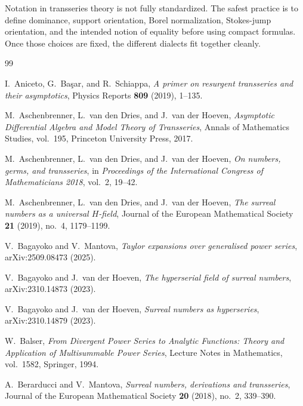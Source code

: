 \documentclass[11pt,openany]{book}
\theoremstyle{definition}
\theoremstyle{plain}
\theoremstyle{remark}
\begin{document}
\begin{summarybox}
Notation in transseries theory is not fully standardized. The safest practice
is to define dominance, support orientation, Borel normalization, Stokes-jump
orientation, and the intended notion of equality before using compact
formulas. Once those choices are fixed, the different dialects fit together
cleanly.
\end{summarybox}


\backmatter

\begin{thebibliography}{99}
{}

I.~Aniceto, G.~Ba\c{s}ar, and R.~Schiappa,
\emph{A primer on resurgent transseries and their asymptotics},
Physics Reports \textbf{809} (2019), 1--135.

M.~Aschenbrenner, L.~van den Dries, and J.~van der Hoeven,
\emph{Asymptotic Differential Algebra and Model Theory of Transseries},
Annals of Mathematics Studies, vol.~195, Princeton University Press, 2017.

M.~Aschenbrenner, L.~van den Dries, and J.~van der Hoeven,
\emph{On numbers, germs, and transseries},
in \emph{Proceedings of the International Congress of Mathematicians 2018},
vol.~2, 19--42.

M.~Aschenbrenner, L.~van den Dries, and J.~van der Hoeven,
\emph{The surreal numbers as a universal $H$-field},
Journal of the European Mathematical Society \textbf{21} (2019), no.~4,
1179--1199.

V.~Bagayoko and V.~Mantova,
\emph{Taylor expansions over generalised power series},
arXiv:2509.08473 (2025).

V.~Bagayoko and J.~van der Hoeven,
\emph{The hyperserial field of surreal numbers},
arXiv:2310.14873 (2023).

V.~Bagayoko and J.~van der Hoeven,
\emph{Surreal numbers as hyperseries},
arXiv:2310.14879 (2023).

W.~Balser,
\emph{From Divergent Power Series to Analytic Functions: Theory and
Application of Multisummable Power Series},
Lecture Notes in Mathematics, vol.~1582, Springer, 1994.

A.~Berarducci and V.~Mantova,
\emph{Surreal numbers, derivations and transseries},
Journal of the European Mathematical Society \textbf{20} (2018), no.~2,
339--390.


\end{thebibliography}
\end{document}
